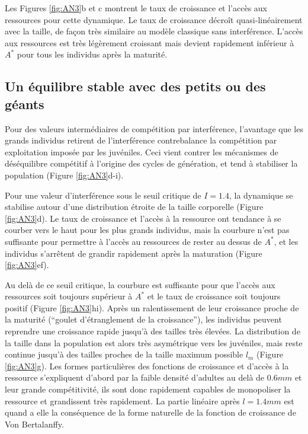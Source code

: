 Les Figures \ref{fig:AN3}b et c montrent le taux de croissance et l'accès aux
ressources pour cette dynamique. Le taux de croissance décroît
quasi-linéairement avec la taille, de façon très similaire au modèle classique
sans interférence. L'accès aux ressources est très légèrement croissant mais
devient rapidement inférieur à $A^*$ pour tous les individus après la maturité. 

\subsection{Un équilibre stable avec des petits ou des géants}

Pour des valeurs intermédiaires de compétition par interférence, l'avantage
que les grands individus retirent de l'interférence contrebalance la compétition
par exploitation imposée par les juvéniles. Ceci vient contrer les mécanismes
de déséquilibre compétitif à l'origine des cycles de génération, et tend à
stabiliser la population (Figure \ref{fig:AN3}d-i).

Pour une valeur d'interférence sous le seuil critique de $I=1.4$, la dynamique
se stabilise autour d'une distribution étroite de la taille corporelle (Figure
\ref{fig:AN3}d). Le taux de croissance et l'accès à la ressource ont tendance à
se courber vers le haut pour les plus grands individus, mais la courbure n'est
pas suffisante pour permettre à l'accès au ressources de rester au dessus de
$A^*$, et les individus s'arrêtent de grandir rapidement après la maturation (Figure
\ref{fig:AN3}ef).

Au delà de ce seuil critique, la courbure est suffisante pour que l'accès aux
ressources soit toujours supérieur à $A^*$ et le taux de croissance soit
toujours positif (Figure \ref{fig:AN3}hi). Après un ralentissement de leur
croissance proche de la maturité (``goulet d'étranglement de la croissance''), les individus peuvent
reprendre une croissance rapide jusqu'à des tailles très élevées. La
distribution de la taille dans la population est alors très asymétrique vers les
juvéniles, mais reste continue jusqu'à des tailles proches de la taille maximum
possible $l_m$ (Figure \ref{fig:AN3}g). Les formes particulières des fonctions
de croissance et d'accès à la ressource s'expliquent d'abord par la faible
densité d'adultes au delà de $0.6mm$ et leur grande compétitivité, ils
sont donc rapidement capables de monopoliser la ressource et grandissent très
rapidement. La partie linéaire après $l=1.4mm$ est quand a elle la conséquence
de la forme naturelle de la fonction de croissance de Von Bertalanffy. 


